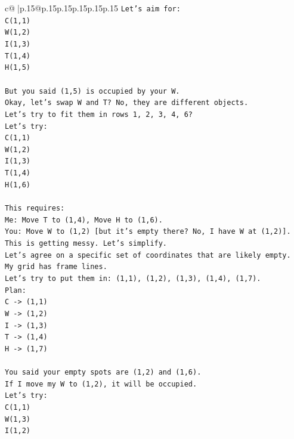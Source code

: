 \documentclass{article}
\begin{document}
{\begin{supertabular}{c@{$\;$}|p{.15\linewidth}@{}p{.15\linewidth}p{.15\linewidth}p{.15\linewidth}p{.15\linewidth}p{.15\linewidth}}
{{{\texttt{Let's aim for:} \\
\texttt{C(1,1)} \\
\texttt{W(1,2)} \\
\texttt{I(1,3)} \\
\texttt{T(1,4)} \\
\texttt{H(1,5)} \\
\\ 
\texttt{But you said (1,5) is occupied by your W.} \\
\texttt{Okay, let's swap W and T? No, they are different objects.} \\
\texttt{Let's try to fit them in rows 1, 2, 3, 4, 6?} \\
\texttt{Let's try:} \\
\texttt{C(1,1)} \\
\texttt{W(1,2)} \\
\texttt{I(1,3)} \\
\texttt{T(1,4)} \\
\texttt{H(1,6)} \\
\\ 
\texttt{This requires:} \\
\texttt{Me: Move T to (1,4), Move H to (1,6).} \\
\texttt{You: Move W to (1,2) {[}but it's empty there? No, I have W at (1,2){]}.} \\
\texttt{This is getting messy. Let's simplify.} \\
\texttt{Let's agree on a specific set of coordinates that are likely empty.} \\
\texttt{My grid has frame lines.} \\
\texttt{Let's try to put them in: (1,1), (1,2), (1,3), (1,4), (1,7).} \\
\texttt{Plan:} \\
\texttt{C {-}> (1,1)} \\
\texttt{W {-}> (1,2)} \\
\texttt{I {-}> (1,3)} \\
\texttt{T {-}> (1,4)} \\
\texttt{H {-}> (1,7)} \\
\\ 
\texttt{You said your empty spots are (1,2) and (1,6).} \\
\texttt{If I move my W to (1,2), it will be occupied.} \\
\texttt{Let's try:} \\
\texttt{C(1,1)} \\
\texttt{W(1,3)} \\
\texttt{I(1,2)} \\
}}}
\end{supertabular}}
\end{document}
